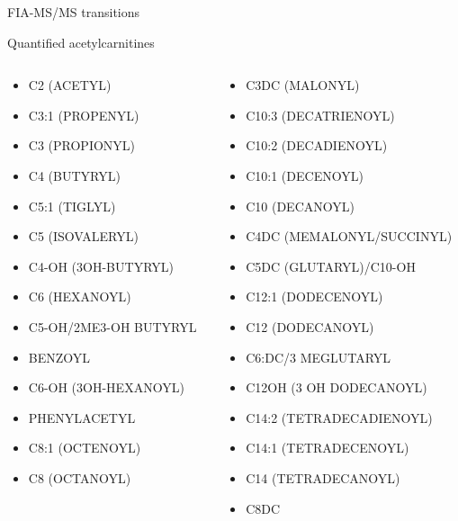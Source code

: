 \documentclass[presentation, smaller]{beamer}
\begin{document}
\begin{frame}[label={sec:orgheadline17}]{FIA-MS/MS transitions}
\begin{block}{Quantified acetylcarnitines}
\tiny

\begin{columns}
\begin{column}{0.33\columnwidth}
\begin{itemize}
\item C2 (ACETYL)
\item C3:1 (PROPENYL)
\item C3 (PROPIONYL)
\item C4 (BUTYRYL)
\item C5:1 (TIGLYL)
\item C5 (ISOVALERYL)
\item C4-OH (3OH-BUTYRYL)
\item C6 (HEXANOYL)
\item C5-OH/2ME3-OH BUTYRYL
\item BENZOYL
\item C6-OH (3OH-HEXANOYL)
\item PHENYLACETYL
\item C8:1 (OCTENOYL)
\item C8 (OCTANOYL)
\end{itemize}
\end{column}

\begin{column}{0.33\columnwidth}
\begin{itemize}
\item C3DC (MALONYL)
\item C10:3 (DECATRIENOYL)
\item C10:2 (DECADIENOYL)
\item C10:1 (DECENOYL)
\item C10 (DECANOYL)
\item C4DC (MEMALONYL/SUCCINYL)
\item C5DC (GLUTARYL)/C10-OH
\item C12:1 (DODECENOYL)
\item C12 (DODECANOYL)
\item C6:DC/3 MEGLUTARYL
\item C12OH (3 OH DODECANOYL)
\item C14:2 (TETRADECADIENOYL)
\item C14:1 (TETRADECENOYL)
\item C14 (TETRADECANOYL)
\item C8DC
\end{itemize}
\end{column}


\end{columns}
\end{block}
\end{frame}
\end{document}
